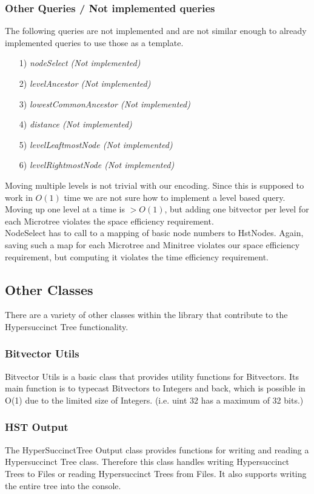 \documentclass{article}
\begin{document}
\subsubsection{Other Queries / Not implemented queries}
The following queries are not implemented and are not similar enough to already implemented queries to use those as a template.
\begin{itemize}
	\item[1)] \textit{nodeSelect (Not implemented)}
	\item[2)] \textit{levelAncestor (Not implemented)}
	\item[3)] \textit{lowestCommonAncestor (Not implemented)}
	\item[4)] \textit{distance (Not implemented)}
	\item[5)] \textit{levelLeaftmostNode (Not implemented)}
	\item[6)] \textit{levelRightmostNode (Not implemented)}
\end{itemize}
Moving multiple levels is not trivial with our encoding. Since this is supposed to work in $O(1)$ time we are not sure how to implement a level based query. Moving up one level at a time is $> O(1)$, but adding one bitvector per level for each Microtree violates the space efficiency requirement.\\
NodeSelect has to call to a mapping of basic node numbers to HstNodes. Again, saving such a map for each Microtree and Minitree violates our space efficiency requirement, but computing it violates the time efficiency requirement.

\subsection{Other Classes}
There are a variety of other classes within the library that contribute to the Hypersuccinct Tree functionality.
\subsubsection{Bitvector Utils}
Bitvector Utils is a basic class that provides utility functions for Bitvectors. Its main function is to typecast Bitvectors to Integers and back, which is possible in O(1) due to the limited size of Integers. (i.e. uint 32 has a maximum of 32 bits.)
\subsubsection{HST Output}
The HyperSuccinctTree Output class provides functions for writing and reading a Hypersuccinct Tree class. Therefore this class handles writing Hypersuccinct Trees to Files or reading Hypersuccinct Trees from Files. It also supports writing the entire tree into the console.
\end{document}
